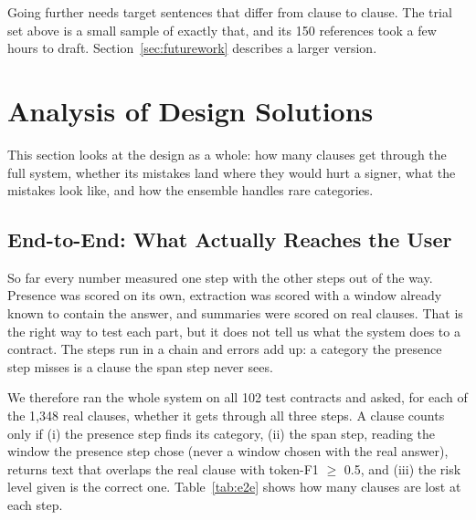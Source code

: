 Going further needs target sentences that differ from clause to clause. The trial set above is a small sample of exactly that, and its 150 references took a few hours to draft. Section~\ref{sec:futurework} describes a larger version.

\section{Analysis of Design Solutions}
This section looks at the design as a whole: how many clauses get through the full system, whether its mistakes land where they would hurt a signer, what the mistakes look like, and how the ensemble handles rare categories.

\subsection{End-to-End: What Actually Reaches the User}
\label{sec:e2e}

So far every number measured one step with the other steps out of the way. Presence was scored on its own, extraction was scored with a window already known to contain the answer, and summaries were scored on real clauses. That is the right way to test each part, but it does not tell us what the system does to a contract. The steps run in a chain and errors add up: a category the presence step misses is a clause the span step never sees.

We therefore ran the whole system on all 102 test contracts and asked, for each of the 1{,}348 real clauses, whether it gets through all three steps. A clause counts only if (i) the presence step finds its category, (ii) the span step, reading the window the presence step chose (never a window chosen with the real answer), returns text that overlaps the real clause with token-F1 $\geq$ 0.5, and (iii) the risk level given is the correct one. Table~\ref{tab:e2e} shows how many clauses are lost at each step.


